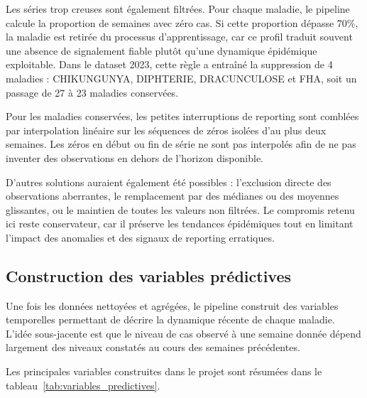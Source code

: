 Les séries trop creuses sont également filtrées. Pour chaque maladie, le pipeline calcule la proportion de semaines avec zéro cas. Si cette proportion dépasse 70\%, la maladie est retirée du processus d'apprentissage, car ce profil traduit souvent une absence de signalement fiable plutôt qu'une dynamique épidémique exploitable. Dans le dataset 2023, cette règle a entraîné la suppression de 4 maladies : CHIKUNGUNYA, DIPHTERIE, DRACUNCULOSE et FHA, soit un passage de 27 à 23 maladies conservées.

Pour les maladies conservées, les petites interruptions de reporting sont comblées par interpolation linéaire sur les séquences de zéros isolées d'au plus deux semaines. Les zéros en début ou fin de série ne sont pas interpolés afin de ne pas inventer des observations en dehors de l'horizon disponible.

D'autres solutions auraient également été possibles : l'exclusion directe des observations aberrantes, le remplacement par des médianes ou des moyennes glissantes, ou le maintien de toutes les valeurs non filtrées. Le compromis retenu ici reste conservateur, car il préserve les tendances épidémiques tout en limitant l'impact des anomalies et des signaux de reporting erratiques.

\subsection{Construction des variables prédictives}

Une fois les données nettoyées et agrégées, le pipeline construit des variables temporelles permettant de décrire la dynamique récente de chaque maladie. L'idée sous-jacente est que le niveau de cas observé à une semaine donnée dépend largement des niveaux constatés au cours des semaines précédentes.

Les principales variables construites dans le projet sont résumées dans le tableau~\ref{tab:variables_predictives}.

